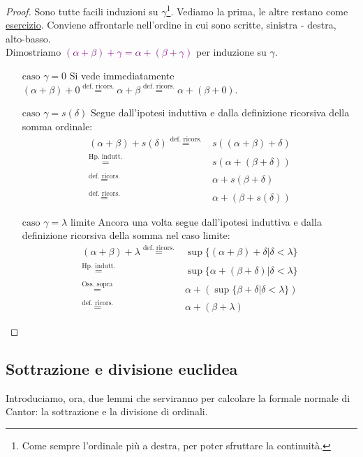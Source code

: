 \begin{proof}
	Sono tutte facili induzioni su $\gamma$\footnote{Come sempre l'ordinale più a destra, per poter sfruttare la continuità.}. Vediamo la prima, le altre restano come \underline{esercizio}. Conviene affrontarle nell'ordine in cui sono scritte, sinistra - destra, alto-basso.\\
	Dimostriamo \textcolor{purple}{$(\alpha + \beta) + \gamma = \alpha + (\beta + \gamma)$} per induzione su $\gamma$.
	\begin{itemize}
		\item[$\boxed{\text{caso $\gamma = 0$}}$] Si vede immediatamente $(\alpha + \beta) + 0 \overset{\text{def. ricors.}}{=} \alpha + \beta \overset{\text{def. ricors.}}{=} \alpha + (\beta + 0)$.
		\item[$\boxed{\text{caso $\gamma = s(\delta)$}}$] Segue dall'ipotesi induttiva e dalla definizione ricorsiva della somma ordinale:
		\[\begin{split}
			(\alpha + \beta) + s(\delta) \overset{\text{def. ricors.}}{=}& s((\alpha + \beta) + \delta) \\
										 \overset{\text{Hp. indutt.}}{=}& s(\alpha + (\beta + \delta)) \\
										 \overset{\text{def. ricors.}}{=}& \alpha + s(\beta + \delta) \\
										 \overset{\text{def. ricors.}}{=}& \alpha + (\beta + s(\delta))
		\end{split}
			\]
		\item[$\boxed{\text{caso $\gamma = \lambda$ limite}}$] Ancora una volta segue dall'ipotesi induttiva e dalla definizione ricorsiva della somma nel caso limite:
		\[ \begin{split}
			(\alpha + \beta) + \lambda \overset{\text{def. ricors.}}{=} & \sup\{(\alpha + \beta) + \delta | \delta < \lambda\} \\
									   \overset{\text{Hp. indutt.}}{=}  & \sup\{\alpha + (\beta + \delta) | \delta < \lambda\} \\
									   \overset{\text{Oss. sopra}}{=}   &  \alpha + (\sup\{\beta + \delta | \delta < \lambda\}) \\
									   \overset{\text{def. ricors.}}{=} & \alpha + (\beta + \lambda)
			\end{split}
			\]
	\end{itemize}	
\end{proof}

\pagebreak

\subsection{Sottrazione e divisione euclidea}
Introduciamo, ora, due lemmi che serviranno per calcolare la formale normale di Cantor: la sottrazione e la divisione di ordinali.

